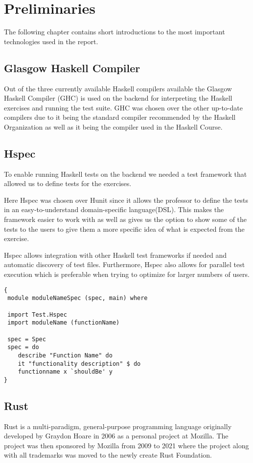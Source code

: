  \chapter{Preliminaries}
The following chapter contains short introductions to the most important technologies used in the report. 

\section{Glasgow Haskell Compiler} %
Out of the three currently available Haskell compilers available the Glasgow Haskell Compiler (GHC) is used on the backend for interpreting the Haskell exercises and running the test suite. GHC was chosen over the other up-to-date compilers due to it being the standard compiler recommended by the Haskell Organization \cite{Haskell_GHC} as well as it being the compiler used in the Haskell Course.

\section{Hspec}
To enable running Haskell tests on the backend we needed a test framework that allowed us to define tests for the exercises. 

Here Hspec was chosen over Hunit since it allows the professor to define the tests in an easy-to-understand domain-specific language(DSL). 
This makes the framework easier to work with as well as gives us the option to show some of the tests to the users to give them a more specific idea of what is expected from the exercise.

Hspec allows integration with other Haskell test frameworks if needed and automatic discovery of test files. 
Furthermore, Hspec also allows for parallel test execution which is preferable when trying to optimize for larger numbers of users.

\begin{lstlisting}[language=CSharp, caption={An example of a Hspec Test.}, label={lst:HspecTestExample}]
{
 module moduleNameSpec (spec, main) where

 import Test.Hspec
 import moduleName (functionName)
 
 spec = Spec
 spec = do
 	describe "Function Name" do
 	it "functionality description" $ do
	functionname x `shouldBe' y
}
\end{lstlisting}

\section{Rust}
Rust is a multi-paradigm, general-purpose programming language originally developed by Graydon Hoare in 2006 as a personal project at Mozilla. 
The project was then sponsored by Mozilla from 2009 to 2021 where the project along with all trademarks was moved to the newly create Rust Foundation. 


